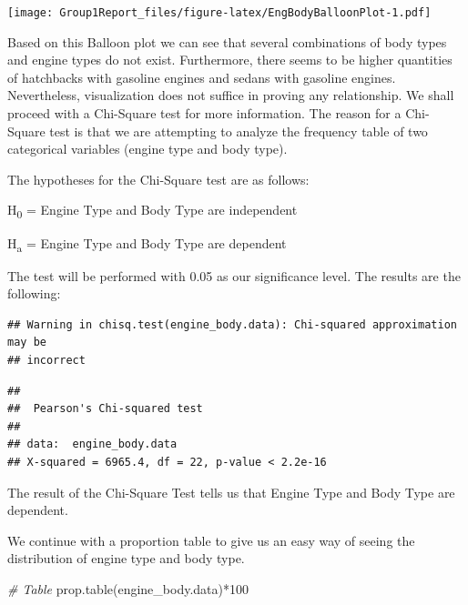 \documentclass[
]{article}
\newenvironment{Shaded}{\begin{snugshade}}{\end{snugshade}}
\newcommand{\CommentTok}[1]{\textcolor[rgb]{0.56,0.35,0.01}{\textit{#1}}}
\newcommand{\DecValTok}[1]{\textcolor[rgb]{0.00,0.00,0.81}{#1}}
\newcommand{\FunctionTok}[1]{\textcolor[rgb]{0.00,0.00,0.00}{#1}}
\newcommand{\NormalTok}[1]{#1}
\newcommand{\OtherTok}[1]{\textcolor[rgb]{0.56,0.35,0.01}{#1}}
\newcommand{\SpecialCharTok}[1]{\textcolor[rgb]{0.00,0.00,0.00}{#1}}
\begin{document}
\texttt{[image: Group1Report\_files/figure-latex/EngBodyBalloonPlot-1.pdf]}

Based on this Balloon plot we can see that several combinations of body
types and engine types do not exist. Furthermore, there seems to be
higher quantities of hatchbacks with gasoline engines and sedans with
gasoline engines. Nevertheless, visualization does not suffice in
proving any relationship. We shall proceed with a Chi-Square test for
more information. The reason for a Chi-Square test is that we are
attempting to analyze the frequency table of two categorical variables
(engine type and body type).

The hypotheses for the Chi-Square test are as follows:

H\textsubscript{0} = Engine Type and Body Type are independent

H\textsubscript{a} = Engine Type and Body Type are dependent

The test will be performed with 0.05 as our significance level. The
results are the following:

\begin{Shaded}
\end{Shaded}

\begin{verbatim}
## Warning in chisq.test(engine_body.data): Chi-squared approximation may be
## incorrect
\end{verbatim}

\begin{verbatim}
## 
##  Pearson's Chi-squared test
## 
## data:  engine_body.data
## X-squared = 6965.4, df = 22, p-value < 2.2e-16
\end{verbatim}

The result of the Chi-Square Test tells us that Engine Type and Body
Type are dependent.

We continue with a proportion table to give us an easy way of seeing the
distribution of engine type and body type.

\begin{Shaded}
\begin{Highlighting}[]
\CommentTok{\# Table}
\FunctionTok{prop.table}\NormalTok{(engine\_body.data)}\SpecialCharTok{*}\DecValTok{100}
\end{Highlighting}
\end{Shaded}
\end{document}

